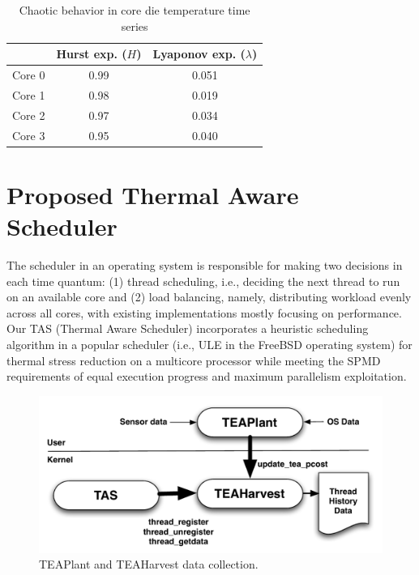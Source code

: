 \documentclass[times, 10pt,twocolumn]{IEEEtran}
\begin{document}
\begin{small}
\begin{table}[tbhp]
\caption{Chaotic behavior in core die temperature time series}
\label{tab:chaotic} 
\centering 
\begin{tabular}{lcc}
\hline
\hline
 & Hurst exp. ($H$) & Lyaponov exp. ($\lambda$) \\
\hline
Core 0 & 0.99 & 0.051 \\
Core 1 & 0.98 & 0.019 \\
Core 2 & 0.97 & 0.034 \\
Core 3 & 0.95 & 0.040 \\
\hline
\end{tabular}
\end{table}
\end{small}

\section{Proposed Thermal Aware Scheduler}
\label{sec:sdesign} 
The scheduler in an operating system is responsible for making two
decisions in each time quantum: (1) thread scheduling, i.e., deciding
the next thread to run on an available core and (2) load balancing,
namely, distributing workload evenly across all cores, with existing
implementations mostly focusing on performance.  Our TAS (Thermal Aware
Scheduler) incorporates a heuristic scheduling algorithm in a popular
scheduler (i.e., ULE in the FreeBSD operating system) for thermal stress
reduction on a multicore processor while meeting the SPMD requirements
of equal execution progress and maximum parallelism exploitation.

\begin{figure}[btph] \centering
  \includegraphics[scale=0.45]{tasdesign}
  \caption{TEAPlant and TEAHarvest data collection.}
  \label{fig:teaplant}
\end{figure}
\end{document}
